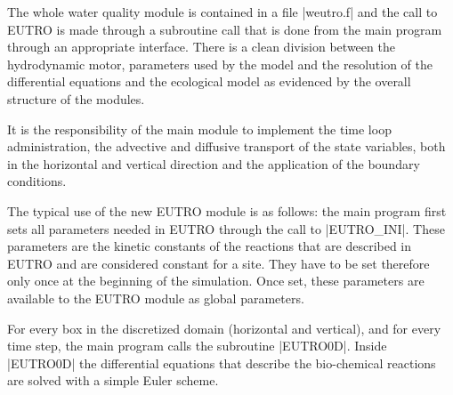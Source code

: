 The whole water quality module is contained in a file
|weutro.f| and the call to EUTRO is made through a subroutine call
that is done from the main program through an appropriate 
interface. There is a clean division between the hydrodynamic 
motor, parameters used by the model and the resolution of the 
differential equations and the ecological model as evidenced 
by the overall structure of the modules. 

It is the responsibility of the main module to implement the 
time loop administration, the advective and diffusive transport 
of the state variables, both in the horizontal and vertical direction 
and the application of the boundary conditions. 

The typical use of the new EUTRO module is as follows: the main 
program first sets all parameters needed in EUTRO through the 
call to |EUTRO_INI|. These parameters are the kinetic constants 
of the reactions that are described in EUTRO and are considered 
constant for a site. They have to be set therefore only once 
at the beginning of the simulation. Once set, these parameters 
are available to the EUTRO module as global parameters.

For every box in the discretized domain (horizontal and vertical), 
and for every time step, the main program calls the subroutine 
|EUTRO0D|. Inside |EUTRO0D| the differential equations that describe 
the bio-chemical reactions are solved with a simple Euler scheme.

